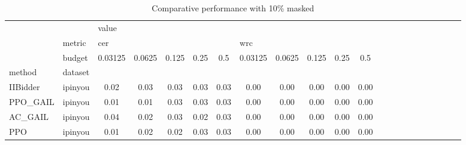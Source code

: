 \begin{table}[htbp]
\centering
\caption{Comparative performance with 10\% masked}
\label{mask_0.10}
\begin{tabular}{l|l|cc|cc|cc|cc|cc|cc|cc|cc|cc|cc}
\toprule
    & {} & \multicolumn{10}{l}{value} \\
    & metric & \multicolumn{5}{l}{cer} & \multicolumn{5}{l}{wrc} \\
    & budget & 0.03125 & 0.0625 & 0.125 & 0.25 &  0.5 & 0.03125 & 0.0625 & 0.125 & 0.25 &  0.5 \\
method & dataset &         &        &       &      &      &         &        &       &      &      \\
\midrule
IIBidder & ipinyou &    0.02 &   0.03 &  0.03 & 0.03 & 0.03 &    0.00 &   0.00 &  0.00 & 0.00 & 0.00 \\
PPO\_GAIL & ipinyou &    0.01 &   0.01 &  0.03 & 0.03 & 0.03 &    0.00 &   0.00 &  0.00 & 0.00 & 0.00 \\
AC\_GAIL & ipinyou &    0.04 &   0.02 &  0.03 & 0.02 & 0.03 &    0.00 &   0.00 &  0.00 & 0.00 & 0.00 \\
PPO & ipinyou &    0.01 &   0.02 &  0.02 & 0.03 & 0.03 &    0.00 &   0.00 &  0.00 & 0.00 & 0.00 \\
\bottomrule
\end{tabular}
\end{table}
